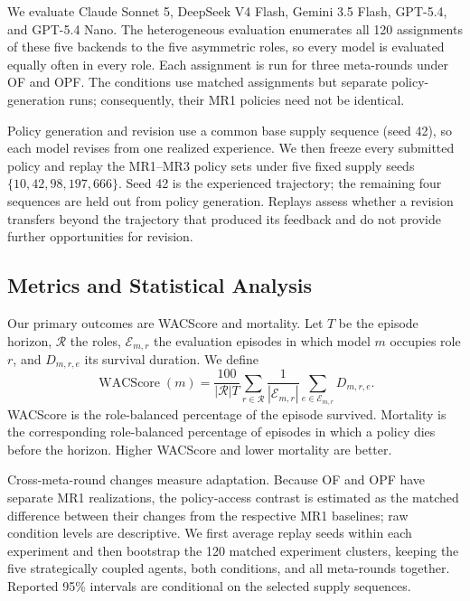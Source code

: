 \documentclass[letterpaper]{article} %
\begin{document}
We evaluate Claude Sonnet 5, DeepSeek V4 Flash, Gemini 3.5 Flash,
GPT-5.4, and GPT-5.4 Nano. The heterogeneous evaluation enumerates all
120 assignments of these five backends to the five asymmetric roles, so
every model is evaluated equally often in every role. Each assignment is
run for three meta-rounds under OF and OPF. The conditions use matched
assignments but separate policy-generation runs; consequently, their MR1
policies need not be identical.

Policy generation and revision use a common base supply sequence (seed 42),
so each model revises from one realized experience. We then freeze every
submitted policy and replay the MR1--MR3 policy sets under five fixed supply
seeds $\{10,42,98,197,666\}$. Seed 42 is the experienced trajectory; the
remaining four sequences are held out from policy generation. Replays assess
whether a revision transfers beyond the trajectory that produced its
feedback and do not provide further opportunities for revision.

\subsection{Metrics and Statistical Analysis}

Our primary outcomes are WACScore and mortality. Let $T$ be the episode
horizon, $\mathcal{R}$ the roles, $\mathcal{E}_{m,r}$ the evaluation episodes
in which model $m$ occupies role $r$, and $D_{m,r,e}$ its survival duration.
We define
\begin{equation}
    \operatorname{WACScore}(m)
    =
    \frac{100}{|\mathcal{R}|T}
    \sum_{r\in\mathcal{R}}
    \frac{1}{|\mathcal{E}_{m,r}|}
    \sum_{e\in\mathcal{E}_{m,r}}D_{m,r,e}.
\end{equation}
WACScore is the role-balanced percentage of the episode survived. Mortality
is the corresponding role-balanced percentage of episodes in which a policy
dies before the horizon. Higher WACScore and lower mortality are better.

Cross-meta-round changes measure adaptation. Because OF and OPF have separate
MR1 realizations, the policy-access contrast is estimated as the matched
difference between their changes from the respective MR1 baselines; raw
condition levels are descriptive. We first average replay seeds within each
experiment and then bootstrap the 120 matched experiment clusters, keeping
the five strategically coupled agents, both conditions, and all meta-rounds
together. Reported 95\% intervals are conditional on the selected supply
sequences.
\end{document}
